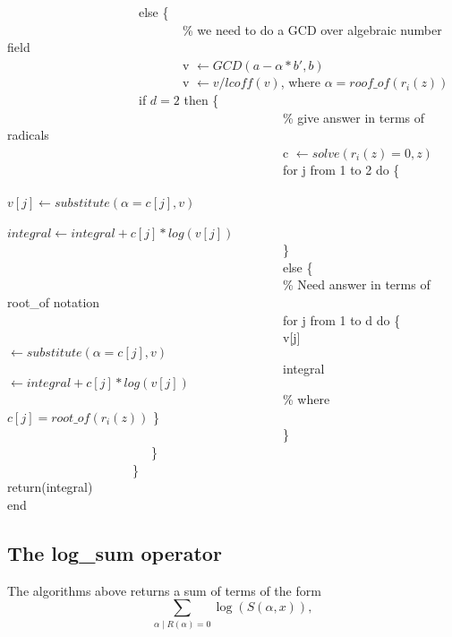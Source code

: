 \begin{flushleft}
~~~~~~~~~~~~~~~~~~~~~else \{ \\
~~~~~~~~~~~~~~~~~~~~~~~~~~~~\%  we need to do a GCD over algebraic number field \\
~~~~~~~~~~~~~~~~~~~~~~~~~~~~v $\leftarrow GCD(a-\alpha*b',b)$ \\
~~~~~~~~~~~~~~~~~~~~~~~~~~~~v $\leftarrow v/lcoff(v) $, \hspace{3 mm}
 where $\alpha=roof\_of(r_{i}(z))$ \\
~~~~~~~~~~~~~~~~~~~~~if $d=2$ then \{ \\
~~~~~~~~~~~~~~~~~~~~~~~~~~~~~~~~~~~~~~~~~~~~\% give answer in terms of radicals  \\
~~~~~~~~~~~~~~~~~~~~~~~~~~~~~~~~~~~~~~~~~~~~c $\leftarrow solve(r_{i}(z)=0,z)$ \\
~~~~~~~~~~~~~~~~~~~~~~~~~~~~~~~~~~~~~~~~~~~~for j from 1 to 2 do \{ \\
~~~~~~~~~~~~~~~~~~~~~~~~~~~~~~~~~~~~~~~~~~~~$v[j] \leftarrow substitute(\alpha=c[j],v)$ \\
~~~~~~~~~~~~~~~~~~~~~~~~~~~~~~~~~~~~~~~~~~~~$integral \leftarrow integral+c[j]*log(v[j])$ \\
~~~~~~~~~~~~~~~~~~~~~~~~~~~~~~~~~~~~~~~~~~~~\} \\
~~~~~~~~~~~~~~~~~~~~~~~~~~~~~~~~~~~~~~~~~~~~else \{ \\
~~~~~~~~~~~~~~~~~~~~~~~~~~~~~~~~~~~~~~~~~~~~\% Need answer in terms of root\_of notation \\
~~~~~~~~~~~~~~~~~~~~~~~~~~~~~~~~~~~~~~~~~~~~for j from 1 to d do \{ \\
~~~~~~~~~~~~~~~~~~~~~~~~~~~~~~~~~~~~~~~~~~~~v[j] $\leftarrow substitute(\alpha=c[j],v)$ \\
~~~~~~~~~~~~~~~~~~~~~~~~~~~~~~~~~~~~~~~~~~~~integral $\leftarrow integral+c[j]*log(v[j])$ \\
~~~~~~~~~~~~~~~~~~~~~~~~~~~~~~~~~~~~~~~~~~~~\% where $c[j]=root\_of(r_{i}(z))$ \} \\
~~~~~~~~~~~~~~~~~~~~~~~~~~~~~~~~~~~~~~~~~~~~\} \\
~~~~~~~~~~~~~~~~~~~~~~~\} \\
~~~~~~~~~~~~~~~~~~~~\} \\
return(integral) \\
end
\end{flushleft}

\subsection{The log\_sum operator}
The algorithms above returns a sum of terms of the form
\[ \sum_{\alpha \mid R(\alpha)=0} \log(S(\alpha,x)), \]

